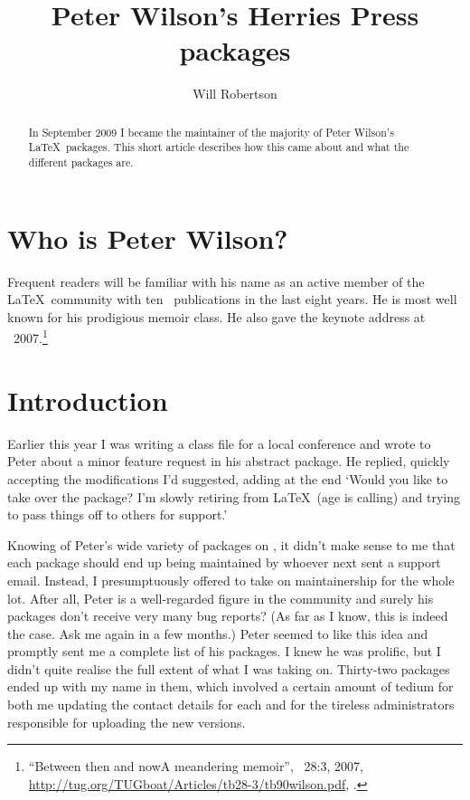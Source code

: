 \documentclass[final]{ltugboat}
\title{Peter Wilson's Herries Press packages}
\author{Will Robertson}
\begin{document}
\maketitle
\begin{abstract}
In September 2009 I became the maintainer of the majority of Peter Wilson's \LaTeX\ packages. This short article describes how this came about and what the different packages are.
\end{abstract}

\section{Who is Peter Wilson?}

Frequent readers will be familiar with his name as an active member of the \LaTeX\ community with ten \TUB\ publications in the last eight years. He is most well known for his prodigious \textsf{memoir} class. He also gave the keynote address at ~2007.\footnote{%
``Between then and now\Dash A meandering memoir'', \TUB\ 28:3, 2007, \url{http://tug.org/TUGboat/Articles/tb28-3/tb90wilson.pdf},
.}

\section{Introduction}

Earlier this year I was writing a class file for a local conference and wrote to Peter about a minor feature request in his \textsf{abstract} package. He replied, quickly accepting the modifications I'd suggested, adding at the end `{Would you like to take over the package? I'm slowly retiring from \LaTeX\ (age is calling) and trying to pass things off to others for support.}'

Knowing of Peter's wide variety of packages on , it didn't make sense to me that each package should end up being maintained by whoever next sent a support email. Instead, I presumptuously offered to take on maintainership for the whole lot. After all, Peter is a well-regarded figure in the community and surely his packages don't receive very many bug reports? (As far as I know, this is indeed the case. Ask me again in a few months.) Peter seemed to like this idea and promptly sent me a complete list of his packages. I knew he was prolific, but I didn't quite realise the full extent of what I was taking on. Thirty-two packages ended up with my name in them, which involved a certain amount of tedium for both me updating the contact details for each and for the tireless  administrators responsible for uploading the new versions.
\end{document}
